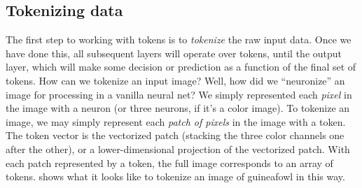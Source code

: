 \subsection{Tokenizing data}
The first step to working with tokens is to \textit{tokenize} the raw input data. Once we have done this, all subsequent layers will operate over tokens, until the output layer, which will make some decision or prediction as a function of the final set of tokens. How can we tokenize an input image? Well, how did we ``neuronize'' an image for processing in a vanilla neural net? We simply represented each \textit{pixel} in the image with a neuron (or three neurons, if it's a color image). To tokenize an image, we may simply represent each \textit{patch of pixels} in the image with a token. The token vector is the vectorized patch (stacking the three color channels one after the other), or a lower-dimensional projection of the vectorized patch. 
With each patch represented by a token, the full image corresponds to an array of tokens. \fig{\ref{fig:transformers:tokenization}} shows what it looks like to tokenize an image of guineafowl in this way.
